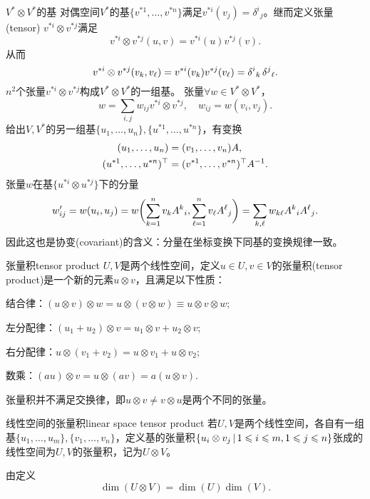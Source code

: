 \begin{example}{$V^\ast\otimes V^\ast$的基}{}
	对偶空间$V^\ast$的基$\{v^{\ast 1},\ldots,v^{\ast n}\}$满足$v^{\ast i}(v_j)=\delta^i{}_j$。继而定义张量(tensor) $v^{\ast i}\otimes v^{\ast j}$满足
	\[
		v^{\ast i}\otimes v^{\ast j}(u,v)=v^{\ast i}(u)v^{\ast j}(v).
	\]
	从而
	\[
		v^{\ast i}\otimes v^{\ast j}(v_k,v_\ell)=v^{\ast i}(v_k)v^{\ast j}(v_\ell)=\delta^i{}_k\mathop{}\!\delta^j{}_\ell.
	\]
	$n^2$个张量$v^{\ast i}\otimes v^{\ast j}$构成$V^\ast\otimes V^\ast$的一组基。
	\tcblower
	张量$\forall w\in V^\ast\otimes V^\ast$，
	\[
		w=\sum_{i,j}w_{ij}v^{\ast i}\otimes v^{\ast j},\quad w_{ij}=w(v_i,v_j).
	\]
	给出$V,V^\ast$的另一组基$\{u_1,\ldots,u_n\},\{u^{\ast 1},\ldots,u^{\ast n}\}$，有变换
	\begin{align*}
		(u_1,\ldots,u_n)&=(v_1,\ldots,v_n)A,\\
		(u^{\ast 1},\ldots,u^{\ast n})^\top&=(v^{\ast 1},\ldots,v^{\ast n})^\top A^{-1}.
	\end{align*}
	张量$w$在基$\{u^{\ast i}\otimes u^{\ast j}\}$下的分量
	\[
		w'_{ij}=w(u_i,u_j)=w\biggl(\sum_{k=1}^nv_kA^k{}_i,\sum_{\ell=1}^nv_\ell A^\ell{}_j\biggr)=\sum_{k,\ell}w_{k\ell}A^k{}_iA^\ell{}_j.
	\]
	因此这也是协变(covariant)的含义：分量在坐标变换下同基的变换规律一致。
\end{example}
\begin{definition}{张量积}{tensor product}
	$U,V$是两个线性空间，定义$u\in U,v\in V$的张量积(tensor product)是一个新的元素$u\otimes v$，且满足以下性质：
	\begin{compactitem}
		\item 结合律：$(u\otimes v)\otimes w=u\otimes(v\otimes w)\equiv u\otimes v\otimes w;$
		\item 左分配律：$(u_1+u_2)\otimes v=u_1\otimes v+u_2\otimes v;$
		\item 右分配律：$u\otimes(v_1+v_2)=u\otimes v_1+u\otimes v_2;$
		\item 数乘：$(au)\otimes v=u\otimes(av)=a(u\otimes v).$
	\end{compactitem}
\end{definition}
张量积并不满足交换律，即$u\otimes v\neq v\otimes u$是两个不同的张量。
\begin{definition}{线性空间的张量积}{linear space tensor product}
	若$U,V$是两个线性空间，各自有一组基$\{u_1,\ldots,u_m\},\{v_1,\ldots,v_n\}$，定义基的张量积$\left\{u_i\otimes v_j\,\middle\vert\,1\leqslant i\leqslant m,1\leqslant j\leqslant n\right\}$张成的线性空间为$U,V$的张量积，记为$U\otimes V$。
\end{definition}
由定义 
\[
	\dim(U\otimes V)=\dim(U)\dim(V).
\]
